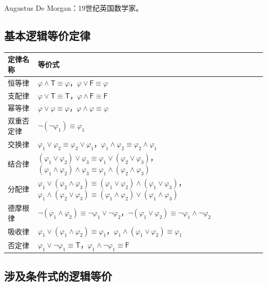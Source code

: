 \documentclass[UTF8,11pt,a4paper]{ctexbook}   %
\theoremstyle{definition}
\begin{document}
Augustus De Morgan：19世纪英国数学家。

\subsection{基本逻辑等价定律}

\begin{table}[htbp]
\centering
\small

\centering
\begin{tabular}{|l|l|}
\hline
\textbf{定律名称} & \textbf{等价式} \\
\hline
恒等律 & $\varphi \land \mathsf{T} \equiv \varphi$，$\varphi \lor \mathsf{F} \equiv \varphi$ \\
支配律 & $\varphi \lor \mathsf{T} \equiv \mathsf{T}$，$\varphi \land \mathsf{F} \equiv \mathsf{F}$ \\
幂等律 & $\varphi \lor \varphi \equiv \varphi$，$\varphi \land \varphi \equiv \varphi$ \\
双重否定律 & $\neg(\neg\varphi_1) \equiv \varphi_1$ \\
交换律 & $\varphi_1 \lor \varphi_2 \equiv \varphi_2 \lor \varphi_1$，$\varphi_1 \land \varphi_2 \equiv \varphi_2 \land \varphi_1$ \\
结合律 & $(\varphi_1 \lor \varphi_2) \lor \varphi_3 \equiv \varphi_1 \lor (\varphi_2 \lor \varphi_3)$，$(\varphi_1 \land \varphi_2) \land \varphi_3 \equiv \varphi_1 \land (\varphi_2 \land \varphi_3)$ \\
分配律 & $\varphi_1 \lor (\varphi_2 \land \varphi_3) \equiv (\varphi_1 \lor \varphi_2) \land (\varphi_1 \lor \varphi_3)$，$\varphi_1 \land (\varphi_2 \lor \varphi_3) \equiv (\varphi_1 \land \varphi_2) \lor (\varphi_1 \land \varphi_3)$ \\
德摩根律 & $\neg(\varphi_1 \land \varphi_2) \equiv \neg\varphi_1 \lor \neg\varphi_2$，$\neg(\varphi_1 \lor \varphi_2) \equiv \neg\varphi_1 \land \neg\varphi_2$ \\
吸收律 & $\varphi_1 \lor (\varphi_1 \land \varphi_2) \equiv \varphi_1$，$\varphi_1 \land (\varphi_1 \lor \varphi_2) \equiv \varphi_1$ \\
否定律 & $\varphi_1 \lor \neg\varphi_1 \equiv \mathsf{T}$，$\varphi_1 \land \neg\varphi_1 \equiv \mathsf{F}$ \\
\hline
\end{tabular}
\end{table}


\subsection{涉及条件式的逻辑等价}
\end{document}
